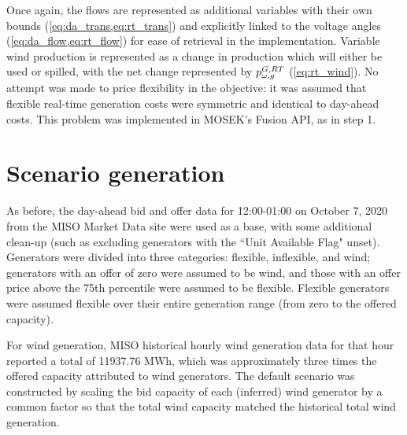 \documentclass[11pt,a4paper]{article}
\numberwithin{equation}{section}
\begin{document}
Once again, the flows are represented as additional variables with their own bounds (\cref{eq:da_trans,eq:rt_trans}) and explicitly linked to the voltage angles (\cref{eq:da_flow,eq:rt_flow}) for ease of retrieval in the implementation.
Variable wind production is represented as a change in production which will either be used or spilled, with the net change represented by $p^{G,RT}_{\omega,g}$ (\cref{eq:rt_wind}).
No attempt was made to price flexibility in the objective: it was assumed that flexible real-time generation costs were symmetric and identical to day-ahead costs.
This problem was implemented in MOSEK's Fusion API, as in step 1.

\section{Scenario generation}
\label{sec:scenario}

As before, the day-ahead bid and offer data for 12:00-01:00 on October 7, 2020 from the MISO Market Data site \cite{MISOMarketData} were used as a base, with some additional clean-up (such as excluding generators with the ``Unit Available Flag" unset).
Generators were divided into three categories: flexible, inflexible, and wind; generators with an offer of zero were assumed to be wind, and those with an offer price above the 75th percentile were assumed to be flexible.
Flexible generators were assumed flexible over their entire generation range (from zero to the offered capacity).

For wind generation, MISO historical hourly wind generation data for that hour reported a total of 11937.76 MWh, which was approximately three times the offered capacity attributed to wind generators.
The default scenario was constructed by scaling the bid capacity of each (inferred) wind generator by a common factor so that the total wind capacity matched the historical total wind generation.
\end{document}
